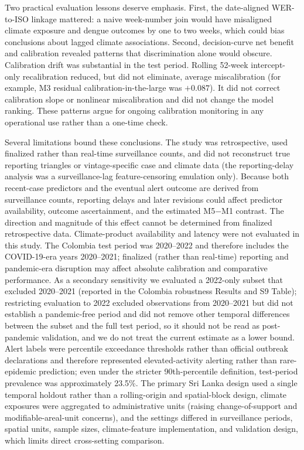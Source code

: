 \documentclass[11pt,a4paper]{article}
\begin{document}
Two practical evaluation lessons deserve emphasis. First, the date-aligned WER-to-ISO linkage mattered: a naive week-number join would have misaligned climate exposure and dengue outcomes by one to two weeks, which could bias conclusions about lagged climate associations. Second, decision-curve net benefit and calibration revealed patterns that discrimination alone would obscure. Calibration drift was substantial in the test period. Rolling 52-week intercept-only recalibration reduced, but did not eliminate, average miscalibration (for example, M3 residual calibration-in-the-large was $+0.087$). It did not correct calibration slope or nonlinear miscalibration and did not change the model ranking. These patterns argue for ongoing calibration monitoring in any operational use rather than a one-time check.

Several limitations bound these conclusions. The study was retrospective, used finalized rather than real-time surveillance counts, and did not reconstruct true reporting triangles or vintage-specific case and climate data (the reporting-delay analysis was a surveillance-lag feature-censoring emulation only). Because both recent-case predictors and the eventual alert outcome are derived from surveillance counts, reporting delays and later revisions could affect predictor availability, outcome ascertainment, and the estimated M5$-$M1 contrast. The direction and magnitude of this effect cannot be determined from finalized retrospective data. Climate-product availability and latency were not evaluated in this study. The Colombia test period was 2020--2022 and therefore includes the COVID-19-era years 2020--2021; finalized (rather than real-time) reporting and pandemic-era disruption may affect absolute calibration and comparative performance. As a secondary sensitivity we evaluated a 2022-only subset that excluded 2020--2021 (reported in the Colombia robustness Results and S9 Table); restricting evaluation to 2022 excluded observations from 2020--2021 but did not establish a pandemic-free period and did not remove other temporal differences between the subset and the full test period, so it should not be read as post-pandemic validation, and we do not treat the current estimate as a lower bound. Alert labels were percentile exceedance thresholds rather than official outbreak declarations and therefore represented elevated-activity alerting rather than rare-epidemic prediction; even under the stricter 90th-percentile definition, test-period prevalence was approximately 23.5\%. The primary Sri Lanka design used a single temporal holdout rather than a rolling-origin and spatial-block design, climate exposures were aggregated to administrative units (raising change-of-support and modifiable-areal-unit concerns), and the settings differed in surveillance periods, spatial units, sample sizes, climate-feature implementation, and validation design, which limits direct cross-setting comparison. 
\end{document}
